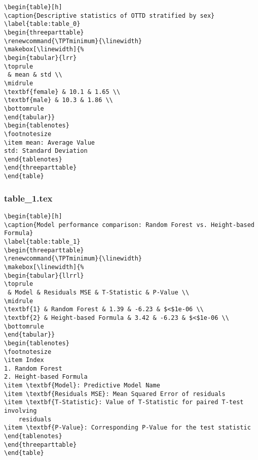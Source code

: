 \documentclass[11pt]{article}
\begin{document}
\begin{Verbatim}[tabsize=4]
\begin{table}[h]
\caption{Descriptive statistics of OTTD stratified by sex}
\label{table:table_0}
\begin{threeparttable}
\renewcommand{\TPTminimum}{\linewidth}
\makebox[\linewidth]{%
\begin{tabular}{lrr}
\toprule
 & mean & std \\
\midrule
\textbf{female} & 10.1 & 1.65 \\
\textbf{male} & 10.3 & 1.86 \\
\bottomrule
\end{tabular}}
\begin{tablenotes}
\footnotesize
\item mean: Average Value
std: Standard Deviation
\end{tablenotes}
\end{threeparttable}
\end{table}

\end{Verbatim}

\subsubsection*{table\_1.tex}

\begin{Verbatim}[tabsize=4]
\begin{table}[h]
\caption{Model performance comparison: Random Forest vs. Height-based Formula}
\label{table:table_1}
\begin{threeparttable}
\renewcommand{\TPTminimum}{\linewidth}
\makebox[\linewidth]{%
\begin{tabular}{llrrl}
\toprule
 & Model & Residuals MSE & T-Statistic & P-Value \\
\midrule
\textbf{1} & Random Forest & 1.39 & -6.23 & $<$1e-06 \\
\textbf{2} & Height-based Formula & 3.42 & -6.23 & $<$1e-06 \\
\bottomrule
\end{tabular}}
\begin{tablenotes}
\footnotesize
\item Index
1. Random Forest
2. Height-based Formula
\item \textbf{Model}: Predictive Model Name
\item \textbf{Residuals MSE}: Mean Squared Error of residuals
\item \textbf{T-Statistic}: Value of T-Statistic for paired T-test involving
	residuals
\item \textbf{P-Value}: Corresponding P-Value for the test statistic
\end{tablenotes}
\end{threeparttable}
\end{table}

\end{Verbatim}
\end{document}
